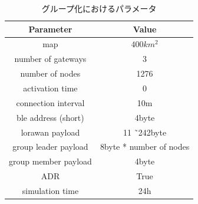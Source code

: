 \documentclass[Japanese]{dicomopapers}
\begin{document}
\begin{table}[h]
    \centering
    \caption{LoRaWANのユースケース}\label{fig:LoRaWAN_Usecase}
\end{table}

\begin{table}[h]
    \centering
    \caption{グループ化におけるパラメータ}\label{fig:group_parameter}
    \begin{tabular}{|c|c|}
    \hline
    \textbf{Parameter}     & \textbf{Value}               \\ \hline
    map                    & $400km^{2}$    　             \\ \hline
    number of gateways     & 3                             \\ \hline
    number of nodes        & 1276                          \\ \hline
    activation time        & 0                             \\ \hline
    connection interval    & 10m                           \\ \hline
    ble address (short)    & 4byte                         \\ \hline
    lorawan payload        & 11 \~\ 242byte                \\ \hline
    group leader payload   & 8byte * number of nodes       \\ \hline
    group member payload   & 4byte                         \\ \hline
    ADR                    & True                          \\ \hline
    simulation time        & 24h                           \\ \hline
    \end{tabular}
\end{table}
\end{document}
